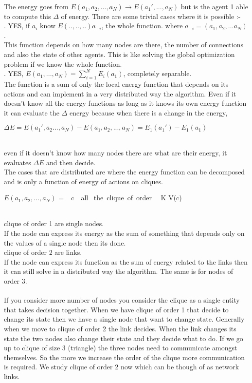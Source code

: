 The energy goes from $E(a_1,a_2,...,a_N) \longrightarrow E(a_1',...,a_N)$ but is the agent 1 able to compute this $\Delta$ of energy. There are some trivial cases where it is possible :-  \\ \hfill {}. YES, if $a_i$ know $E(..,..,..) a_{-i}$, the whole function. where $a_{-i} = (a_1 , a_2 , ... a_N)$.\\ 
This function depends on how many nodes are there, the number of connections and also the state of other agents. This is like solving the global optimization problem if we know the whole function.\\ \hfill {}. YES, $E(a_1,...,a_N) = \sum_{i=1}^{N} E_i(a_1)$, completely separable. \\ The function is a sum of only the local energy function that depends on its actions and can implement in a very distributed way the algorithm. Even if it doesn't know all the energy functions as long as it knows its own energy function it can evaluate the $\Delta$ energy because when there is a change in the energy, \\ 
\begin{center}
$\Delta E = E(a_1',a_2...,a_N) - E(a_1,a_2,...,a_N) = E_1(a_1') - E_1(a_1)$
\end{center}\\
even if it doesn't know how many nodes there are what are their energy, it evaluates $\Delta E$ and then decide. \\
The  cases that are distributed are where the energy function can be decomposed and is only a function of energy of actions on cliques. \\
\begin{center}
$E(a_1,a_2,...,a_N)$ = \sum_{c \, \in \,all \, the\, clique\, of \,order \, \leq \, K } V(c)  \\ \\
\end{center}
clique of order 1 are single nodes.\\
If the node can express its energy as the sum of something that depends only on the values of a single node then its done.\\ clique of order 2 are links.\\
If the node can express its function as the sum of energy related to the links then it can still solve in a distributed way the algorithm. The same is for nodes of order 3.\\ \\
If you consider more number of nodes you consider the clique as a single entity that takes decision together. When we have clique of order 1 that decide to change its state then we have a single node that want to change state. Generally when we move to clique of order 2 the link decides. When the link changes its state the two nodes also change their state and they decide what to do. If we go up to clique of size 3 (triangle) the three nodes need to communicate amongst themselves. So the more we increase the order of the clique more communication is required. 
We study clique of order 2 now which can be though of as network links.
\\
